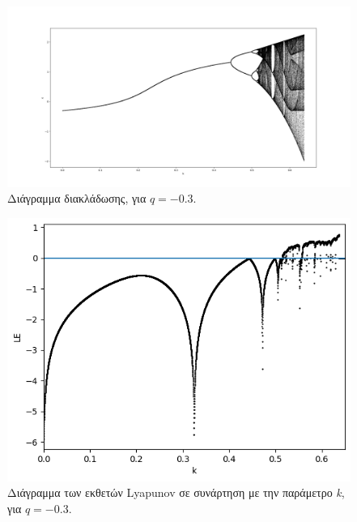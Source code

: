 \begin{figure}[h!]
	\centering
	\includegraphics[width=0.8\linewidth]{LateX images/graphs q03/g1}
	\caption{ Διάγραμμα διακλάδωσης, για $q=-0.3$.}
	\label{f:g8}
\end{figure}

\begin{figure}[h!]
	\centering
	\includegraphics[width=0.6\linewidth]{LateX images/graphs q03/g2}
	\caption{ Διάγραμμα των εκθετών Lyapunov σε συνάρτηση με την παράμετρο \emph{k}, για $q=-0.3$.}
	\label{f:g9}
\end{figure}

